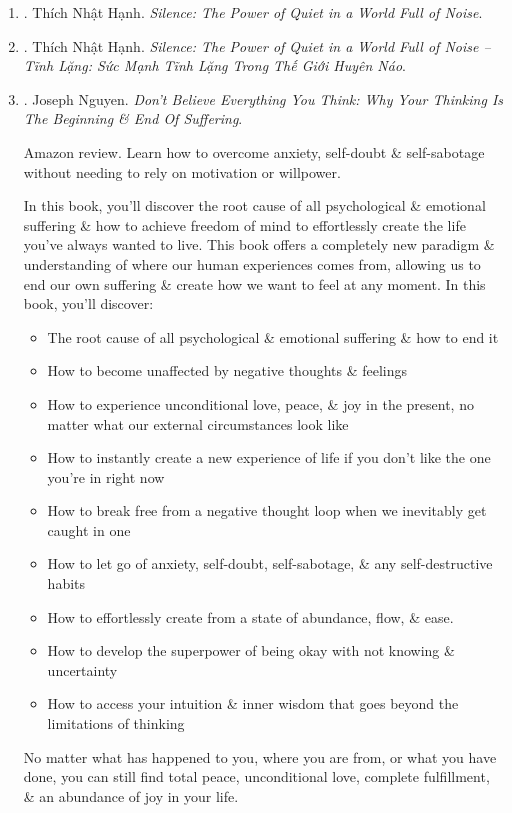 \documentclass{article}
\begin{document}
\begin{enumerate}
	\item \cite{Hanh_silence}. {\sc Thích Nhật Hạnh}. {\it Silence: The Power of Quiet in a World Full of Noise}.
	
	\item \cite{Hanh_silence_VN}. {\sc Thích Nhật Hạnh}. {\it Silence: The Power of Quiet in a World Full of Noise -- Tĩnh Lặng: Sức Mạnh Tĩnh Lặng Trong Thế Giới Huyên Náo}.\hfill{\sf[done]}
	
	\item \cite{Nguyen_dont_believe_think}. {\sc Joseph Nguyen}. {\it Don't Believe Everything You Think: Why Your Thinking Is The Beginning \& End Of Suffering}. {}
	
	{\sf Amazon review.} Learn how to overcome anxiety, self-doubt \& self-sabotage without needing to rely on motivation or willpower.
	
	In this book, you'll discover the root cause of all psychological \& emotional suffering \& how to achieve freedom of mind to effortlessly create the life you've always wanted to live.  This book offers a completely new paradigm \& understanding of where our human experiences comes from, allowing us to end our own suffering \& create how we want to feel at any moment. In this book, you'll discover:
	\begin{itemize}
		\item The root cause of all psychological \& emotional suffering \& how to end it
		\item How to become unaffected by negative thoughts \& feelings
		\item How to experience unconditional love, peace, \& joy in the present, no matter what our external circumstances look like
		\item How to instantly create a new experience of life if you don't like the one you're in right now
		\item How to break free from a negative thought loop when we inevitably get caught in one
		\item How to let go of anxiety, self-doubt, self-sabotage, \& any self-destructive habits
		\item How to effortlessly create from a state of abundance, flow, \& ease.
		\item How to develop the superpower of being okay with not knowing \& uncertainty
		\item How to access your intuition \& inner wisdom that goes beyond the limitations of thinking
	\end{itemize}
	No matter what has happened to you, where you are from, or what you have done, you can still find total peace, unconditional love, complete fulfillment, \& an abundance of joy in your life.
	

\end{enumerate}
\end{document}
